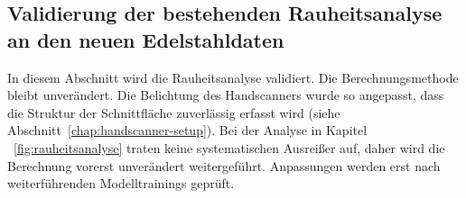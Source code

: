 \newpage

\subsection{Validierung der bestehenden Rauheitsanalyse an den neuen Edelstahldaten}
In diesem Abschnitt wird die Rauheitsanalyse validiert. Die Berechnungsmethode bleibt unverändert. Die Belichtung des Handscanners wurde so angepasst, dass die Struktur der Schnittfläche zuverlässig erfasst wird (siehe Abschnitt~\ref{chap:handscanner-setup}). Bei der Analyse in Kapitel ~\ref{fig:rauheitsanalyse} traten keine systematischen Ausreißer auf, daher wird die Berechnung vorerst unverändert weitergeführt. Anpassungen werden erst nach weiterführenden Modelltrainings geprüft.
